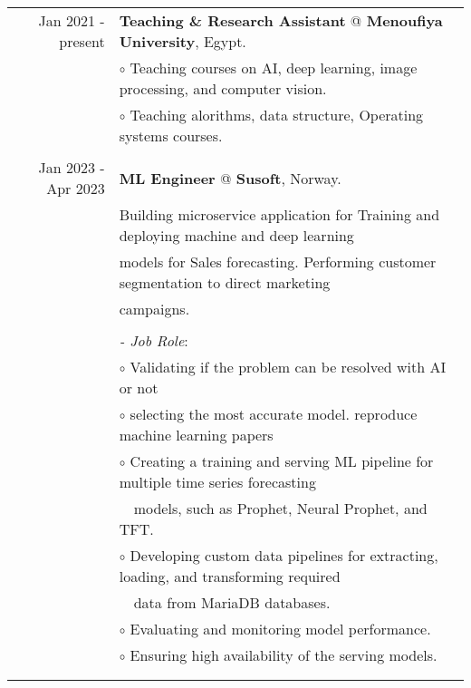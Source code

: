 \documentclass[a4paper,10pt]{article}
\begin{document}
\begin{longtable}{r|l}
    \\
    Jan 2021 - present & \textbf{Teaching \& Research Assistant} @ 
    \textbf{Menoufiya University}, Egypt. \\&
    $\circ$ Teaching courses on AI, deep learning, image processing, and computer vision. \\&
    $\circ$ Teaching alorithms, data structure, Operating systems courses. \\&
    \\
    Jan 2023 - Apr 2023 & \textbf{ML Engineer} @
    \textbf{Susoft}, Norway. \\& 
    Building microservice application for Training and deploying machine and deep learning \\& models for Sales forecasting. 
    Performing customer segmentation to direct marketing \\& campaigns. \\&
    \\&
    \textit{- Job Role}:\\&
    $\circ$ Validating if the problem can be resolved with AI or not \\&
    $\circ$ selecting the most accurate model. reproduce machine learning papers \\&
    $\circ$ Creating a training and serving ML pipeline for multiple time series 
    forecasting \\& ~~models, such as Prophet, Neural Prophet, and TFT. \\&
    $\circ$ Developing custom data pipelines for extracting, loading, and transforming  
    required \\& ~~data from MariaDB databases. \\&
    $\circ$ Evaluating and monitoring model performance. \\&
    $\circ$ Ensuring high availability of the serving models. \\&
    \\&
\end{longtable}
\end{document}
